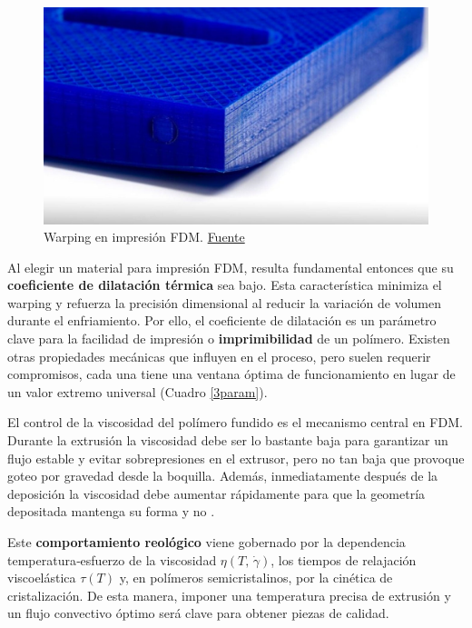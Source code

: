 \begin{figure}[h!]
	\centering
	\includegraphics[width=0.7\linewidth]{imgs/warpi.png}
	\caption{Warping en impresión FDM. \href{https://www.3dnatives.com/es/warping-impresion-3d-que-hacer-100120232/}{Fuente}}
	\label{warpifig}
\end{figure} 


Al elegir un material para impresión FDM, resulta fundamental entonces que su \textbf{coeficiente de dilatación térmica} sea bajo. Esta característica minimiza el warping y refuerza la precisión dimensional al reducir la variación de volumen durante el enfriamiento. Por ello, el coeficiente de dilatación es un parámetro clave para la facilidad de impresión o \textbf{imprimibilidad} de un polímero. Existen otras propiedades mecánicas que influyen en el proceso, pero suelen requerir compromisos, cada una tiene una ventana óptima de funcionamiento en lugar de un valor extremo universal (Cuadro \ref{3param}).

El control de la viscosidad del polímero fundido es el mecanismo central en FDM. Durante la extrusión la viscosidad debe ser lo bastante baja para garantizar un flujo estable y evitar sobrepresiones en el extrusor, pero no tan baja que provoque goteo por gravedad desde la boquilla. Además, inmediatamente después de la deposición la viscosidad debe aumentar rápidamente para que la geometría depositada mantenga su forma y no . 

Este \textbf{comportamiento reológico} viene gobernado por la dependencia temperatura‑esfuerzo de la viscosidad $\eta(T,\,\dot\gamma)$, los tiempos de relajación viscoelástica $\tau(T)$ y, en polímeros semicristalinos, por la cinética de cristalización. De esta manera, imponer una temperatura precisa de extrusión y un flujo convectivo óptimo será clave para obtener piezas de calidad.

